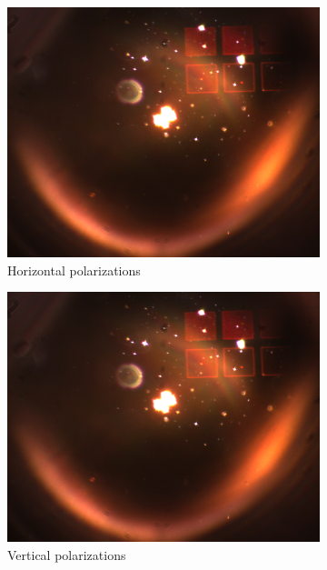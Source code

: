 \begin{figure}[ht]
    \begin{subfigure}{0.3\linewidth}
      \includegraphics[width=\linewidth]{data/Gruppe2/image_6.png}
      \caption{Horizontal polarizations}
      \label{fig:subfig7}
    \end{subfigure}
    \begin{subfigure}{0.3\linewidth}
      \includegraphics[width=\linewidth]{data/Gruppe2/image_7.png}
      \caption{Vertical polarizations}
      \label{fig:subfig8}
    \end{subfigure}
    \begin{subfigure}{0.3\linewidth}

\end{subfigure}
\end{figure}
